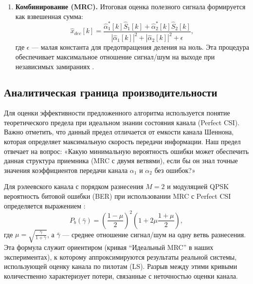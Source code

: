 \documentclass[a4paper,12pt]{article}
\numberwithin{equation}{section}
\begin{document}
\begin{enumerate}
    \textit{Пояснение:} Оценка канала выполняется \textit{только после} разделения. Если пытаться оценить $\alpha_1$ и $\alpha_2$ до разделения, пилоты будут интерферировать друг с другом со случайными фазами, что сделает оценку неустойчивой. Данная процедура опирается на стандартные методы наименьших квадратов в задачах идентификации канала \cite{proakis}.
    
    \item \textbf{Комбинирование (MRC).} Итоговая оценка полезного сигнала формируется как взвешенная сумма:
    \begin{equation}
    \hat{x}_{dec}[k] = \frac{\hat{\alpha}_1^*[k] \hat{S}_1[k] + \hat{\alpha}_2^*[k] \hat{S}_2[k]}{|\hat{\alpha}_1[k]|^2 + |\hat{\alpha}_2[k]|^2 + \epsilon},
    \end{equation}
    где $\epsilon$ — малая константа для предотвращения деления на ноль. Эта процедура обеспечивает максимальное отношение сигнал/шум на выходе при независимых замираниях \cite{proakis}.
\end{enumerate}

\subsection{Аналитическая граница производительности}
Для оценки эффективности предложенного алгоритма используется понятие теоретического предела при идеальном знании состояния канала (Perfect CSI). Важно отметить, что данный предел отличается от емкости канала Шеннона, которая определяет максимальную скорость передачи информации. Наш предел отвечает на вопрос: «Какую минимальную вероятность ошибки может обеспечить данная структура приемника (MRC с двумя ветвями), если бы он знал точные значения коэффициентов передачи канала $\alpha_1$ и $\alpha_2$ без ошибок?»

Для рэлеевского канала с порядком разнесения $M=2$ и модуляцией QPSK вероятность битовой ошибки (BER) при использовании MRC с Perfect CSI определяется выражением \cite{proakis}:
\begin{equation}
P_b(\bar{\gamma}) = \left( \frac{1-\mu}{2} \right)^2 \left( 1 + 2\mu \frac{1+\mu}{2} \right),
\label{eq:ber_theory}
\end{equation}
где $\mu = \sqrt{\frac{\bar{\gamma}}{1+\bar{\gamma}}}$, а $\bar{\gamma}$ — среднее отношение сигнал/шум на одну ветвь разнесения. Эта формула служит ориентиром (кривая ``Идеальный MRC'' в наших экспериментах), к которому аппроксимируются результаты реальной системы, использующей оценку канала по пилотам (LS). Разрыв между этими кривыми количественно характеризует потери, связанные с неточностью оценки канала.
\end{document}
